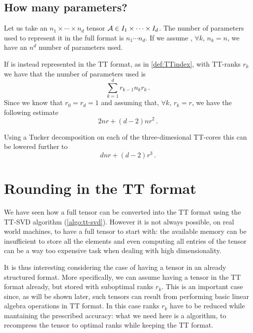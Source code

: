 \subsection{How many parameters?}
Let us take an $n_1 \times \cdots \times n_d$ tensor $\mathcal{A} \in I_1 \times \cdots \times I_d$. The number of parameters used to represent it in the full format is $n_1 \cdots n_d$. If we assume , $\forall k$, $n_k  = n$, we have an $n^d$ number of parameters used.

If \A is instead represented in the TT format, as in \eqref{def:TTindex}, with TT-ranks $r_k$ we have that the number of parameters used is
\begin{equation*}
  \sum_{k=1}^d r_{k-1} n_k r_k\, .
\end{equation*}
Since we know that $r_0 = r_d = 1$ and assuming that, $\forall k$, $r_k = r$, we have the following estimate
\begin{equation*}
  2nr + (d-2)nr^2\, .
\end{equation*}

Using a Tucker decomposition on each of the three-dimesional TT-cores this can be lowered further to
\begin{equation*}
  dnr + (d-2)r^3\, .
\end{equation*}

\section{Rounding in the TT format}
We have seen how a full tensor can be converted into the TT format using the TT-SVD algorithm (\ref{algo:tt-svd}). However it is not always possible, on real world machines, to have a full tensor to start with: the available memory can be insufficient to store all the elements and even computing all entries of the tensor can be a way too expensive task when dealing with high dimensionality.

It is thus interesting considering the case of having a tensor in an already structured format. More specifically, we can assume having a tensor in the TT format already, but stored with suboptimal ranks $r_k$. This is an important case since, as will be shown later, such tensors can result from performing basic linear algebra operations in TT format. In this case ranks $r_k$ have to be reduced while mantaining the prescribed accuracy: what we need here is a  algorithm, to recompress the tensor to optimal ranks while keeping the TT format.

